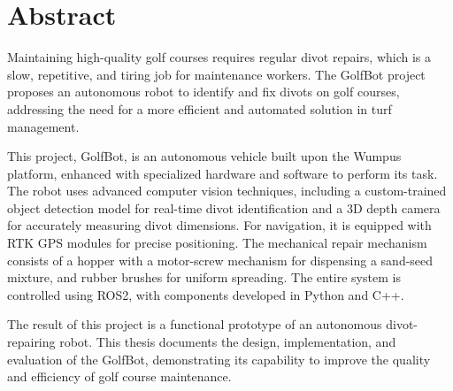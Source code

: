 \chapter*{Abstract}

Maintaining high-quality golf courses requires regular divot repairs, which is a slow, repetitive, and tiring job for maintenance workers. The GolfBot project proposes an autonomous robot to identify and fix divots on golf courses, addressing the need for a more efficient and automated solution in turf management.

This project, GolfBot, is an autonomous vehicle built upon the Wumpus platform, enhanced with specialized hardware and software to perform its task. The robot uses advanced computer vision techniques, including a custom-trained object detection model for real-time divot identification and a 3D depth camera for accurately measuring divot dimensions. For navigation, it is equipped with RTK GPS modules for precise positioning. The mechanical repair mechanism consists of a hopper with a motor-screw mechanism for dispensing a sand-seed mixture, and rubber brushes for uniform spreading. The entire system is controlled using ROS2, with components developed in Python and C++.

The result of this project is a functional prototype of an autonomous divot-repairing robot. This thesis documents the design, implementation, and evaluation of the GolfBot, demonstrating its capability to improve the quality and efficiency of golf course maintenance.
